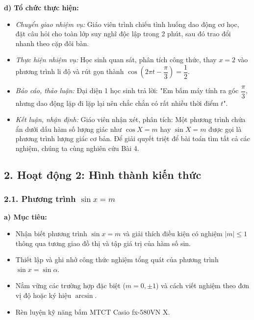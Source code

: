 \documentclass[12pt, a4paper]{article}
\begin{document}
\noindent \textbf{d) Tổ chức thực hiện:}  
\begin{itemize}[leftmargin=0.8cm]  
    \item \textit{Chuyển giao nhiệm vụ:} Giáo viên trình chiếu tình huống dao động cơ học, đặt câu hỏi cho toàn lớp suy nghĩ độc lập trong 2 phút, sau đó trao đổi nhanh theo cặp đôi bàn.  
    \item \textit{Thực hiện nhiệm vụ:} Học sinh quan sát, phân tích công thức, thay $x = 2$ vào phương trình li độ và rút gọn thành $\cos\left(2\pi t - \dfrac{\pi}{3}\right) = \dfrac{1}{2}$.  
    \item \textit{Báo cáo, thảo luận:} Đại diện 1 học sinh trả lời: "Em bấm máy tính ra góc $\dfrac{\pi}{3}$, nhưng dao động lặp đi lặp lại nên chắc chắn có rất nhiều thời điểm $t$".  
    \item \textit{Kết luận, nhận định:} Giáo viên nhận xét, phân tích: Một phương trình chứa ẩn dưới dấu hàm số lượng giác như $\cos X = m$ hay $\sin X = m$ được gọi là phương trình lượng giác cơ bản. Để giải quyết triệt để bài toán tìm tất cả các nghiệm, chúng ta cùng nghiên cứu Bài 4.  
\end{itemize}  
  
\subsection*{2. Hoạt động 2: Hình thành kiến thức}  
  
\subsubsection*{2.1. Phương trình $\sin x = m$}  
  
\noindent \textbf{a) Mục tiêu:}  
\begin{itemize}[leftmargin=0.8cm]  
    \item Nhận biết phương trình $\sin x = m$ và giải thích điều kiện có nghiệm $|m| \le 1$ thông qua tương giao đồ thị và tập giá trị của hàm số sin.  
    \item Thiết lập và ghi nhớ công thức nghiệm tổng quát của phương trình $\sin x = \sin\alpha$.  
    \item Nắm vững các trường hợp đặc biệt ($m = 0, \pm 1$) và cách viết nghiệm theo đơn vị độ hoặc ký hiệu $\arcsin$.  
    \item Rèn luyện kỹ năng bấm MTCT Casio fx-580VN X.  
\end{itemize}  
  
\end{document}
